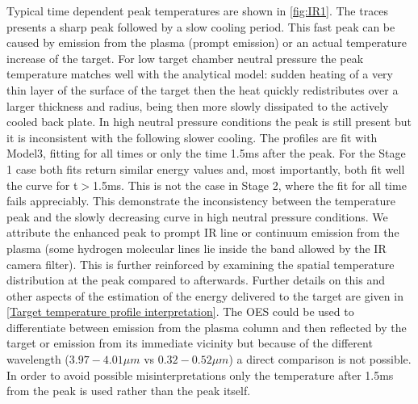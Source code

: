 Typical time dependent peak temperatures are shown in \autoref{fig:IR1}. The traces presents a sharp peak followed by a slow cooling period. This fast peak can be caused by emission from the plasma (prompt emission) or an actual temperature increase of the target. For low target chamber neutral pressure the peak temperature matches well with the analytical model: sudden heating of a very thin layer of the surface of the target then the heat quickly redistributes over a larger thickness and radius, being then more slowly dissipated to the actively cooled back plate.\cite{Li2020,Morgan2020} In high neutral pressure conditions the peak is still present but it is inconsistent with the following slower cooling. The profiles are fit with Model3, fitting for all times or only the time 1.5ms after the peak. For the Stage 1 case both fits return similar energy values and, most importantly, both fit well the curve for t$>$1.5ms. This is not the case in Stage 2, where the fit for all time fails appreciably. This demonstrate the inconsistency between the temperature peak and the slowly decreasing curve in high neutral pressure conditions. We attribute the enhanced peak to prompt IR line or continuum emission from the plasma (some hydrogen molecular lines lie inside the band allowed by the IR camera filter\cite{Sternberg1989}). This is further reinforced by examining the spatial temperature distribution at the peak compared to afterwards. Further details on this and other aspects of the estimation of the energy delivered to the target are given in \autoref{Target temperature profile interpretation}. The OES could be used to differentiate between emission from the plasma column and then reflected by the target or emission from its immediate vicinity but because of the different wavelength ($3.97-4.01\mu m$ vs $0.32-0.52\mu m$) a direct comparison is not possible. In order to avoid possible misinterpretations only the temperature after 1.5ms from the peak is used rather than the peak itself. 

